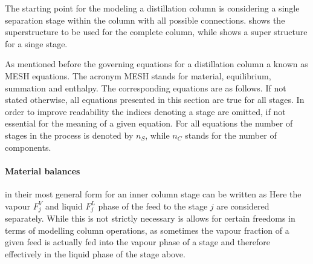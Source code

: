         The starting point for the modeling a distillation column is considering a single separation stage within the
        column with all possible connections.  shows the superstructure to be used for the complete
        column, while  shows a super structure for a singe stage.

        As mentioned before the governing equations for a distillation column a known as MESH equations. The acronym
        MESH stands for material, equilibrium, summation and enthalpy. The corresponding equations are as follows.
        If not stated otherwise, all equations presented in this section are true for all stages. In order
        to improve readability the indices denoting a stage are omitted, if not essential for the meaning of
        a given equation. For all equations the number of stages in the process is denoted by $n_S$, while $n_C$
        stands for the number of components.


        \paragraph{Material balances} in their most general form for an inner column stage can be written as
        Here the vapour $F^V_j$ and liquid $F^L_j$ phase of the feed to the stage $j$ are considered separately.
        While this is not strictly necessary is allows for certain freedoms in terms of modelling
        column operations, as sometimes the vapour fraction of a given feed is actually fed into
        the vapour phase of a stage and therefore effectively in the liquid phase of the stage above.

